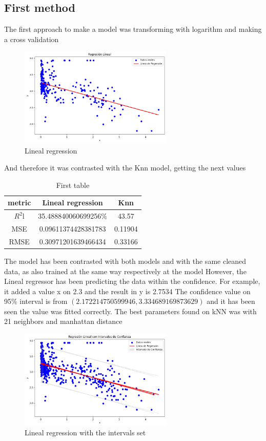 \documentclass{article}
\begin{document}
\subsection{First method}
The first approach to make a model was transforming with logarithm and making a cross validation
\begin{figure}[h]
  \centering
  \includegraphics[width=0.65\textwidth]{model_1.png}
  \caption{Lineal regression}
  \label{fig:example_1}
\end{figure}
And therefore it was contrasted with the Knn model, getting the next values
\begin{table}[H]
\begin{center}
  \begin{tabular}{|c|c|c|}
    \hline
     metric & Lineal regression & Knn \\ \hline
     $R^2$l& 35.488840060699256\%&43.57\\
     MSE&0.09611374428381783&0.11904\\
     RMSE&0.30971201639466434&0.33166\\
     \hline
  \end{tabular}
  \caption{First table}
\end{center}
\end{table}
The model has been contrasted with both models and with the same cleaned data, as also trained at the same way respectively at the model 
However, the Lineal regressor has been predicting the data within the confidence.
For example, it added a value x on 2.3 and the result in y is 2.7534 
The confidence value on 95\% interval is  from $(2.172214750599946, 3.334689169873629)$
and it has been seen the value was fitted correctly.
The best parameters found on kNN was with 21 neighbors and manhattan distance
\begin{figure}[h]
  \center
  \includegraphics[width=0.65\textwidth]{data2_plot.png}
  \caption{Lineal regression with the intervals set}

  \label{fig:example_intervals}
\end{figure}
\end{document}
